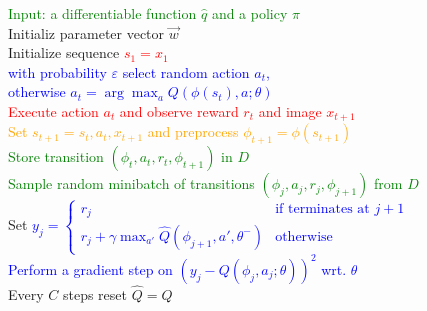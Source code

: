 \documentclass{standalone}
\begin{document}
\pagestyle{empty}
\begin{algorithm}[H]
  \textcolor{Green}{Input: a differentiable function $\hat{q}$ and a policy $\pi$}\\
  \textcolor{Cerulean}{Initializ parameter vector $\vec{w}$} \\
 {
  Initialize sequence \textcolor{red}{$s_1 = {x_1}$}\\
   {
  \textcolor{blue}{with probability $\varepsilon$ select random action $a_t$, \\
  	otherwise $a_t = \arg\max_{a} Q(\phi(s_t), a; \theta)$} \\
  \textcolor{red}{Execute action $a_t$ and observe reward $r_t$ and image $x_{t+1}$}\\
  \textcolor{orange}{Set $s_{t+1} = s_t, a_t, x_{t+1}$ and preprocess $\phi_{t+1} = \phi(s_{t+1})$}\\
  \textcolor{Green}{Store transition $(\phi_t,a_t ,r_t, \phi_{t+1})$ in $D$\\
  Sample random minibatch of transitions $(\phi_j,a_j ,r_j, \phi_{j+1})$ from $D$}\\
  Set \textcolor{blue}{$y_j = \begin{cases}
      r_j & \text{if terminates at } j+1\\
      r_j + \gamma \max_{a'} \hat{Q}(\phi_{j+1}, a', \theta^{-}) & \text{otherwise}
    \end{cases} $} \\
  \textcolor{blue}{Perform a gradient step on $(y_j - Q(\phi_j, a_j; \theta))^2$ wrt. $\theta$}\\
  \textcolor{Cerulean}{Every $C$ steps reset $\hat{Q} = Q$}
  }
}
\end{algorithm}
\end{document}
